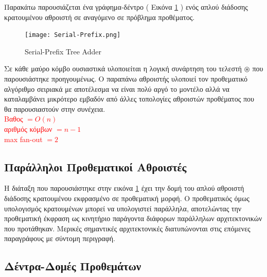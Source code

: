 Παρακάτω παρουσιάζεται ένα γράφημα-δέντρο ( Εικόνα \ref{Serial-PrefixTree} ) 
ενός απλού διάδοσης κρατουμένου αθροιστή σε αναγόμενο σε πρόβλημα προθέματος.\\ 
\begin{figure}[H]
\centering
\texttt{[image: Serial-Prefix.png]}
\caption{Serial-Prefix Tree Adder}
\label{Serial-PrefixTree}
\end{figure}
Σε κάθε μαύρο κόμβο ουσιαστικά υλοποιείται η λογική συνάρτηση του τελεστή $\circledast$
που παρουσιάστηκε προηγουμένως. Ο παραπάνω αθροιστής υλοποιεί τον προθεματικό αλγόριθμο
σειριακά με αποτέλεσμα να είναι πολύ αργό το μοντέλο αλλά να καταλαμβάνει μικρότερο εμβαδόν
από άλλες τοπολογίες αθροιστών προθέματος που θα παρουσιαστούν στην συνέχεια.\\
\textcolor{red}{
Βαθος $= O(n)$\\
αριθμός κόμβων $ = n-1$\\
max fan-out $ = 2$
}













\subsection{Παράλληλοι Προθεματικοί Αθροιστές}
Η διάταξη που παρουσιάστηκε στην εικόνα \ref{Serial-PrefixTree} έχει την δομή 
του απλού αθροιστή διάδοσης κρατουμένου εκφρασμένο σε προθεματική μορφή. Ο προθεματικός
όμως υπολογισμός κρατουμένων μπορεί να υπολογιστεί παράλληλα, αποτελώντας την προθεματική 
έκφραση ως κινητήριο παράγοντα διάφορων παράλληλων αρχιτεκτονικών που προτάθηκαν.
Μερικές σημαντικές αρχιτεκτονικές διατυπώνονται στις επόμενες παραγράφους με σύντομη
περιγραφή.




\subsection{Δέντρα-Δομές Προθεμάτων}





